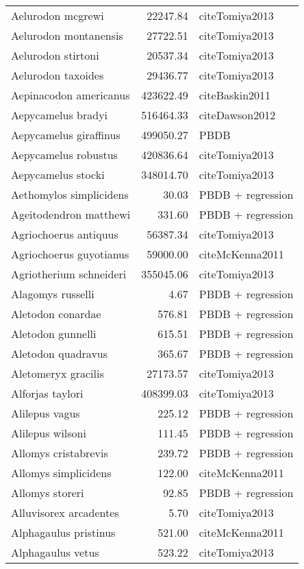 \begin{table}[ht]
\begin{tabular}{lrl}
  Aelurodon mcgrewi & 22247.84 & cite{Tomiya2013} \\ 
  Aelurodon montanensis & 27722.51 & cite{Tomiya2013} \\ 
  Aelurodon stirtoni & 20537.34 & cite{Tomiya2013} \\ 
  Aelurodon taxoides & 29436.77 & cite{Tomiya2013} \\ 
  Aepinacodon americanus & 423622.49 & cite{Baskin2011} \\ 
  Aepycamelus bradyi & 516464.33 & cite{Dawson2012} \\ 
  Aepycamelus giraffinus & 499050.27 & PBDB \\ 
  Aepycamelus robustus & 420836.64 & cite{Tomiya2013} \\ 
  Aepycamelus stocki & 348014.70 & cite{Tomiya2013} \\ 
  Aethomylos simplicidens & 30.03 & PBDB + regression \\ 
  Ageitodendron matthewi & 331.60 & PBDB + regression \\ 
  Agriochoerus antiquus & 56387.34 & cite{Tomiya2013} \\ 
  Agriochoerus guyotianus & 59000.00 & cite{McKenna2011} \\ 
  Agriotherium schneideri & 355045.06 & cite{Tomiya2013} \\ 
  Alagomys russelli & 4.67 & PBDB + regression \\ 
  Aletodon conardae & 576.81 & PBDB + regression \\ 
  Aletodon gunnelli & 615.51 & PBDB + regression \\ 
  Aletodon quadravus & 365.67 & PBDB + regression \\ 
  Aletomeryx gracilis & 27173.57 & cite{Tomiya2013} \\ 
  Alforjas taylori & 408399.03 & cite{Tomiya2013} \\ 
  Alilepus vagus & 225.12 & PBDB + regression \\ 
  Alilepus wilsoni & 111.45 & PBDB + regression \\ 
  Allomys cristabrevis & 239.72 & PBDB + regression \\ 
  Allomys simplicidens & 122.00 & cite{McKenna2011} \\ 
  Allomys storeri & 92.85 & PBDB + regression \\ 
  Alluvisorex arcadentes & 5.70 & cite{Tomiya2013} \\ 
  Alphagaulus pristinus & 521.00 & cite{McKenna2011} \\ 
  Alphagaulus vetus & 523.22 & cite{Tomiya2013} \\ 

\end{tabular}
\end{table}
